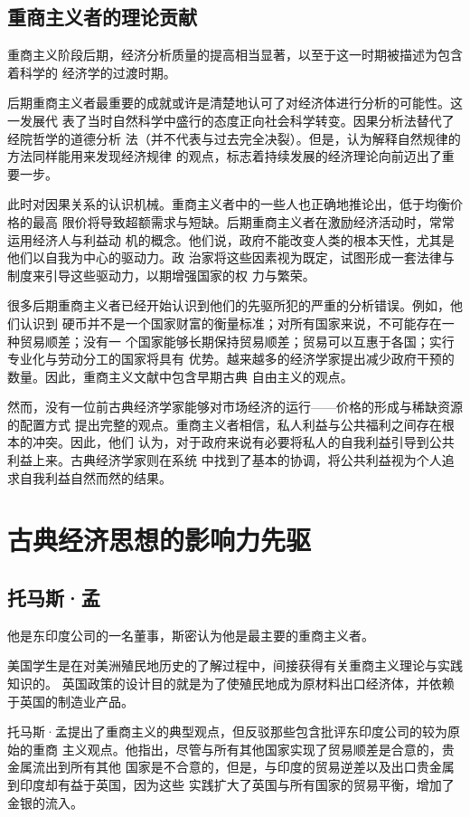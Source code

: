 \subsection{重商主义者的理论贡献}

重商主义阶段后期，经济分析质量的提高相当显著，以至于这一时期被描述为包含着科学的
经济学的过渡时期。

后期重商主义者最重要的成就或许是清楚地认可了对经济体进行分析的可能性。这一发展代
表了当时自然科学中盛行的态度正向社会科学转变。因果分析法替代了经院哲学的道德分析
法（并不代表与过去完全决裂）。但是，认为解释自然规律的方法同样能用来发现经济规律
的观点，标志着持续发展的经济理论向前迈出了重要一步。

此时对因果关系的认识机械。重商主义者中的一些人也正确地推论出，低于均衡价格的最高
限价将导致超额需求与短缺。后期重商主义者在激励经济活动时，常常运用经济人与利益动
机的概念。他们说，政府不能改变人类的根本天性，尤其是他们以自我为中心的驱动力。政
治家将这些因素视为既定，试图形成一套法律与制度来引导这些驱动力，以期增强国家的权
力与繁荣。

很多后期重商主义者已经开始认识到他们的先驱所犯的严重的分析错误。例如，他们认识到
硬币并不是一个国家财富的衡量标准；对所有国家来说，不可能存在一种贸易顺差；没有一
个国家能够长期保持贸易顺差；贸易可以互惠于各国；实行专业化与劳动分工的国家将具有
优势。越来越多的经济学家提出减少政府干预的数量。因此，重商主义文献中包含早期古典
自由主义的观点。

然而，没有一位前古典经济学家能够对市场经济的运行——价格的形成与稀缺资源的配置方式
提出完整的观点。重商主义者相信，私人利益与公共福利之间存在根本的冲突。因此，他们
认为，对于政府来说有必要将私人的自我利益引导到公共利益上来。古典经济学家则在系统
中找到了基本的协调，将公共利益视为个人追求自我利益自然而然的结果。

\section{古典经济思想的影响力先驱}

\subsection{托马斯·孟}

他是东印度公司的一名董事，斯密认为他是最主要的重商主义者。

美国学生是在对美洲殖民地历史的了解过程中，间接获得有关重商主义理论与实践知识的。
英国政策的设计目的就是为了使殖民地成为原材料出口经济体，并依赖于英国的制造业产品。

托马斯·孟提出了重商主义的典型观点，但反驳那些包含批评东印度公司的较为原始的重商
主义观点。他指出，尽管与所有其他国家实现了贸易顺差是合意的，贵金属流出到所有其他
国家是不合意的，但是，与印度的贸易逆差以及出口贵金属到印度却有益于英国，因为这些
实践扩大了英国与所有国家的贸易平衡，增加了金银的流入。

